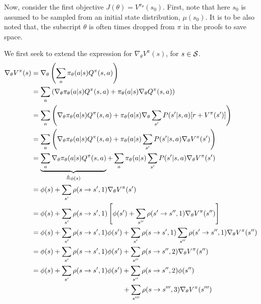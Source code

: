 \documentclass{article}
\begin{document}
Now, consider the first objective $J(\theta) = V^{\pi_\theta}(s_0)$. First, note that here $s_0$ is assumed to be sampled from an initial state distribution, $\mu(s_0)$.
It is to be also noted that, the subscript $\theta$ is often times dropped from $\pi$ in the proofs to save space.
\begin{tcolorbox}[breakable,enhanced,colback=gray!10!white,colframe=gray!50!black,
title={Policy Gradient Derivation for $J(\theta) = V^{\pi_\theta}(s_0)$}]

We first seek to extend the expression for $\nabla_\theta V^\pi(s)$, for $s\in {\mathcal S}$.
\begin{align*}
    \nabla_\theta V^{\pi}(s) &= \nabla_\theta\left(\sum_a \pi_\theta(a|s)Q^\pi(s,a)\right)\\
    &=\sum_a\left(\nabla_\theta \pi_\theta(a|s)Q^\pi(s,a) + \pi_\theta(a|s)\nabla_\theta Q^\pi(s,a)\right) \\
    &= \sum_a\left(\nabla_\theta \pi_\theta(a|s)Q^\pi(s,a) + \pi_\theta(a|s)\nabla_\theta \sum_{s^\prime}P(s^\prime|s,a)[r + V^\pi(s^\prime)]\right)\\
    &=\sum_a\left(\nabla_\theta \pi_\theta(a|s)Q^\pi(s,a) + \pi_\theta(a|s) \sum_{s^\prime}P(s^\prime|s,a) \nabla_\theta V^\pi(s^\prime)\right)\\
    &=\underbrace{\sum_a\nabla_\theta \pi_\theta(a|s)Q^\pi(s,a)}_{\triangleq \phi(s)} + \sum_a\pi_\theta(a|s) \sum_{s^\prime}P(s^\prime|s,a) \nabla_\theta V^\pi(s^\prime)\\
    &=\phi(s) + \sum_{s^\prime}\rho(s\to s^\prime,1) \nabla_\theta V^\pi(s^\prime)\\
    &=\phi(s) + \sum_{s^\prime}\rho(s\to s^\prime,1) \left[ \phi(s^\prime) +\sum_{s^{\dprime}}\rho(s^\prime\to s^{\dprime},1)\nabla_\theta V^\pi(s^{\dprime})\right]\\
    &=\phi(s) + \sum_{s^\prime}\rho(s\to s^\prime,1) \phi(s^\prime) +\sum_{s^\prime}\rho(s\to s^\prime,1)\sum_{s^{\dprime}}\rho(s^\prime\to s^{\dprime},1)\nabla_\theta V^\pi(s^{\dprime})\\
    &=\phi(s) + \sum_{s^\prime}\rho(s\to s^\prime,1) \phi(s^\prime) +\sum_{s^{\dprime}}\rho(s\to s^{\dprime},2)\nabla_\theta V^\pi(s^{\dprime})\\
    &=\phi(s) + \sum_{s^\prime}\rho(s\to s^\prime,1) \phi(s^\prime) +\sum_{s^{\dprime}}\rho(s\to s^{\dprime},2)\phi(s^{\dprime})\\    
    &\phantom{=\phi(s) + \sum_{s^\prime}\rho(s\to s^\prime,1) \phi(s^\prime)~}+\sum_{s^{\tprime}}\rho(s\to s^{\tprime},3)\nabla_\theta V^\pi(s^{\tprime})\\

\end{align*}
\end{tcolorbox}
\end{document}
